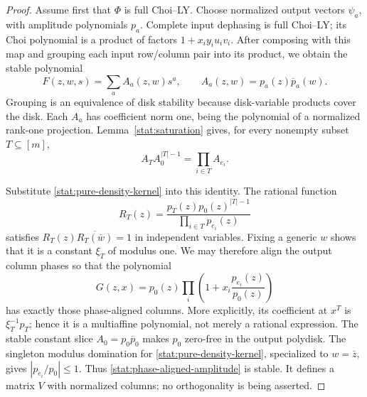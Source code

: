 \documentclass[reqno]{amsart}
\theoremstyle{definition}
\theoremstyle{remark}
\begin{document}
\begin{proof}
Assume first that \(\Phi\) is full Choi--LY.  Choose normalized
output vectors \(\psi_a\), with amplitude polynomials \(p_a\).
Complete input dephasing is full Choi--LY; its Choi polynomial is
a product of factors \(1+x_iy_iu_iv_i\).  After composing with
this map and grouping each input row/column pair into its product,
we obtain the stable polynomial
\begin{equation}
 F(z,w,s)=\sum_a A_a(z,w)s^a,
 \qquad A_a(z,w)=p_a(z)\overline p_a(w).
 \label{stat:pure-density-kernel}
\end{equation}
Grouping is an equivalence of disk stability because disk-variable
products cover the disk.  Each \(A_a\) has coefficient norm one,
being the polynomial of a normalized rank-one projection.
Lemma~\ref{stat:saturation} gives, for every nonempty subset
\(T\subseteq[m]\),
\begin{equation}
 A_T A_0^{|T|-1}=\prod_{i\in T}A_{e_i}.
 \label{stat:pure-column-identity}
\end{equation}

Substitute \eqref{stat:pure-density-kernel} into this identity.
The rational function
\[
 R_T(z)=\frac{p_T(z)p_0(z)^{|T|-1}}
                   {\prod_{i\in T}p_{e_i}(z)}
\]
satisfies \(R_T(z)\overline{R_T(\bar w)}=1\) in independent
variables.  Fixing a generic \(w\) shows that it is a constant
\(\xi_T\) of modulus one.  We may therefore align the output
column phases so that the polynomial
\begin{equation}
 G(z,x)=p_0(z)\prod_i
              \left(1+x_i\frac{p_{e_i}(z)}{p_0(z)}\right)
 \label{stat:phase-aligned-amplitude}
\end{equation}
has exactly those phase-aligned columns.  More explicitly, its
coefficient at \(x^T\) is \(\xi_T^{-1}p_T\); hence it is a
multiaffine polynomial, not merely a rational expression.
The stable constant slice \(A_0=p_0\overline p_0\) makes
\(p_0\) zero-free in the output polydisk.  The singleton modulus
domination for \eqref{stat:pure-density-kernel}, specialized to
\(w=\bar z\), gives \(|p_{e_i}/p_0|\le1\).
Thus \eqref{stat:phase-aligned-amplitude} is stable.  It defines
a matrix \(V\) with normalized columns; no orthogonality is
being asserted.


\end{proof}
\end{document}
